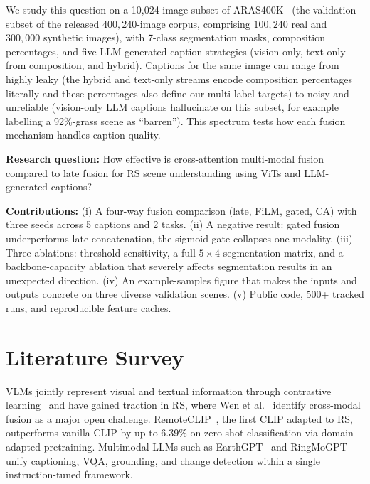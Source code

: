 \documentclass[conference]{IEEEtran}
\begin{document}
We study this question on a 10{,}024-image subset of ARAS400K~\cite{caglar2026aras400k} (the validation subset of the released $400{,}240$-image corpus, comprising $100{,}240$ real and $300{,}000$ synthetic images), with 7-class segmentation masks, composition percentages, and five LLM-generated caption strategies (vision-only, text-only from composition, and hybrid). Captions for the same image can range from highly leaky (the hybrid and text-only streams encode composition percentages literally and these percentages also define our multi-label targets) to noisy and unreliable (vision-only LLM captions hallucinate on this subset, for example labelling a 92\%-grass scene as ``barren''). This spectrum tests how each fusion mechanism handles caption quality.

\textbf{Research question:} How effective is cross-attention multi-modal fusion compared to late fusion for RS scene understanding using ViTs and LLM-generated captions?

\textbf{Contributions:} (i) A four-way fusion comparison (late, FiLM, gated, CA) with three seeds across 5 captions and 2 tasks. (ii) A negative result: gated fusion underperforms late concatenation, the sigmoid gate collapses one modality. (iii) Three ablations: threshold sensitivity, a full $5 \times 4$ segmentation matrix, and a backbone-capacity ablation that severely affects segmentation results in an unexpected direction. (iv) An example-samples figure that makes the inputs and outputs concrete on three diverse validation scenes. (v) Public code, 500+ tracked runs, and reproducible feature caches.

\section{Literature Survey}

VLMs jointly represent visual and textual information through contrastive learning~\cite{radford2021clip} and have gained traction in RS, where Wen et al.~\cite{wen2024vlm} identify cross-modal fusion as a major open challenge. RemoteCLIP~\cite{liu2024remoteclip}, the first CLIP adapted to RS, outperforms vanilla CLIP by up to 6.39\% on zero-shot classification via domain-adapted pretraining. Multimodal LLMs such as EarthGPT~\cite{zhang2024earthgpt} and RingMoGPT~\cite{wang2025ringmogpt} unify captioning, VQA, grounding, and change detection within a single instruction-tuned framework.
\end{document}
